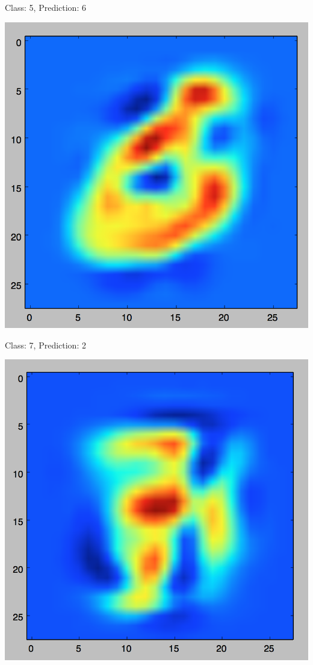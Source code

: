 \documentclass[11pt]{article}
\begin{document}
Class: 5, Prediction: 6

\includegraphics[scale=.3]{images/knn5_5_6.png}

Class: 7, Prediction: 2

\includegraphics[scale=.3]{images/knn5_7_2.png}
\end{document}

